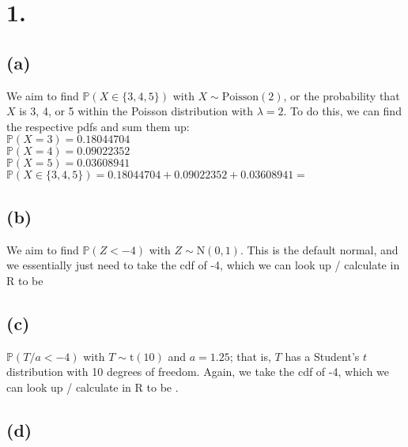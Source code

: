 \documentclass{article}
\begin{document}
\thispagestyle{firstpageheader}

\section*{1.}
{\Large 

%

\subsection*{(a)}

We aim to find $\mathbb{P}(X \in \{3, 4, 5\})$ with $X \sim \text{Poisson}(2)$, or the probability that $X$ is 3, 4, or 5 within the Poisson distribution with $\lambda = 2$. To do this, we can find the respective pdfs and sum them up: \\
$\mathbb{P}(X = 3) = 0.18044704$ \\
$\mathbb{P}(X = 4) = 0.09022352$ \\
$\mathbb{P}(X = 5) = 0.03608941$ \\ 
$\mathbb{P}(X \in \{3, 4, 5\}) = 0.18044704 + 0.09022352 + 0.03608941 = $ 

\subsection*{(b)}

We aim to find $\mathbb{P}(Z < -4)$ with $Z \sim \text{N}(0, 1)$. This is the default normal, and we essentially just need to take the cdf of -4, which we can look up / calculate in R to be 

\subsection*{(c)}

$\mathbb{P}(T / a < -4)$ with $T \sim \text{t}(10)$ and $a = 1.25$; that is, $T$ has a Student's $t$ distribution with 10 degrees of freedom. Again, we take the cdf of -4, which we can look up / calculate in R to be .

\subsection*{(d)}

}
\end{document}
